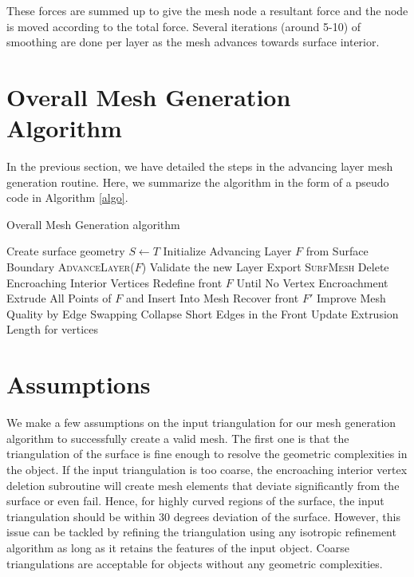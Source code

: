 \documentclass[conf]{new-aiaa}
\begin{document}
These forces are summed up to give the mesh node a resultant force and the node is moved according to the total force. Several iterations (around 5-10) of smoothing are done per layer as the mesh advances towards surface interior.


\section{Overall Mesh Generation Algorithm}

In the previous section, we have detailed the steps in the advancing layer mesh generation routine. Here, we summarize the algorithm in the form of a pseudo code in Algorithm \ref{algo}.

\begin{algorithm}[hbt!]
\caption{Overall Mesh Generation algorithm}\label{alg:euclid}
\begin{algorithmic}[1]
\State Create surface geometry $S \gets T$
\State Initialize Advancing Layer $F$ from Surface Boundary
\State \textsc{AdvanceLayer($F$)}
\State Validate the new Layer
\EndWhile \label{advancing-layer-routine}
\State Export \textsc{SurfMesh}
\EndProcedure
{}
\State Delete Encroaching Interior Vertices
\State Redefine front $F$ Until No Vertex Encroachment
\State Extrude All Points of $F$ and Insert Into Mesh
\State Recover front $F'$ 
\State Improve Mesh Quality by Edge Swapping 
\State Collapse Short Edges in the Front
\State Update Extrusion Length for vertices
\EndProcedure
\end{algorithmic}
\label{algo}
\end{algorithm}

\section{Assumptions}

We make a few assumptions on the input triangulation for our mesh generation algorithm to successfully create a valid mesh. The first one is that the triangulation of the surface is fine enough to resolve the geometric complexities in the object. If the input triangulation is too coarse, the encroaching interior vertex deletion subroutine will create mesh elements that deviate significantly from the surface or even fail. Hence, for highly curved regions of the surface, the input triangulation should be within 30 degrees deviation of the surface. However, this issue can be tackled by refining the triangulation using any isotropic refinement algorithm as long as it retains the features of the input object. Coarse triangulations are acceptable for objects without any geometric complexities.
\end{document}
